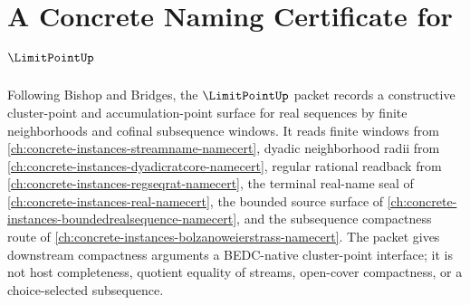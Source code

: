 \chapter{A Concrete Naming Certificate for $\LimitPointUp$}
\label{ch:concrete-instances-limitpoint-namecert}

Following Bishop and Bridges, the $\LimitPointUp$ packet records a constructive cluster-point and accumulation-point surface for real sequences by finite neighborhoods and cofinal subsequence windows. It reads finite windows from \autoref{ch:concrete-instances-streamname-namecert}, dyadic neighborhood radii from \autoref{ch:concrete-instances-dyadicratcore-namecert}, regular rational readback from \autoref{ch:concrete-instances-regseqrat-namecert}, the terminal real-name seal of \autoref{ch:concrete-instances-real-namecert}, the bounded source surface of \autoref{ch:concrete-instances-boundedrealsequence-namecert}, and the subsequence compactness route of \autoref{ch:concrete-instances-bolzanoweierstrass-namecert}. The packet gives downstream compactness arguments a BEDC-native cluster-point interface; it is not host completeness, quotient equality of streams, open-cover compactness, or a choice-selected subsequence.

